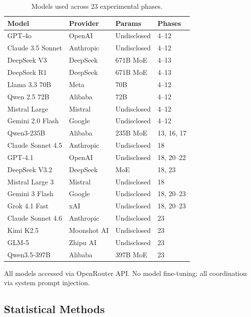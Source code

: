 \documentclass[11pt,a4paper]{article}
\begin{document}
\begin{table}[H]
\centering\small
\caption{Models used across 23 experimental phases.}\label{tab:models}
\begin{tabular}{@{}llll@{}}
\toprule
\textbf{Model} & \textbf{Provider} & \textbf{Params} & \textbf{Phases} \\
\midrule
GPT-4o           & OpenAI      & Undisclosed  & 4--12 \\
Claude 3.5 Sonnet& Anthropic   & Undisclosed  & 4--12 \\
DeepSeek V3      & DeepSeek    & 671B MoE     & 4--13 \\
DeepSeek R1      & DeepSeek    & 671B MoE     & 4--13 \\
Llama 3.3 70B    & Meta        & 70B          & 4--12 \\
Qwen 2.5 72B     & Alibaba     & 72B          & 4--12 \\
Mistral Large    & Mistral     & Undisclosed  & 4--12 \\
Gemini 2.0 Flash & Google      & Undisclosed  & 4--12 \\
Qwen3-235B       & Alibaba     & 235B MoE     & 13, 16, 17 \\
Claude Sonnet 4.5& Anthropic   & Undisclosed  & 18 \\
GPT-4.1          & OpenAI      & Undisclosed  & 18, 20--22 \\
DeepSeek V3.2    & DeepSeek    & MoE          & 18, 23 \\
Mistral Large 3  & Mistral     & Undisclosed  & 18 \\
Gemini 3 Flash   & Google      & Undisclosed  & 18, 20--23 \\
Grok 4.1 Fast    & xAI         & Undisclosed  & 18, 20--23 \\
Claude Sonnet 4.6& Anthropic   & Undisclosed  & 23 \\
Kimi K2.5        & Moonshot AI & Undisclosed  & 23 \\
GLM-5            & Zhipu AI    & Undisclosed  & 23 \\
Qwen3.5-397B     & Alibaba     & 397B MoE     & 23 \\
\bottomrule
\end{tabular}
\end{table}

All models accessed via OpenRouter API.  No model fine-tuning; all
coordination via system prompt injection.

\subsection{Statistical Methods}\label{sec:stats}
\end{document}
